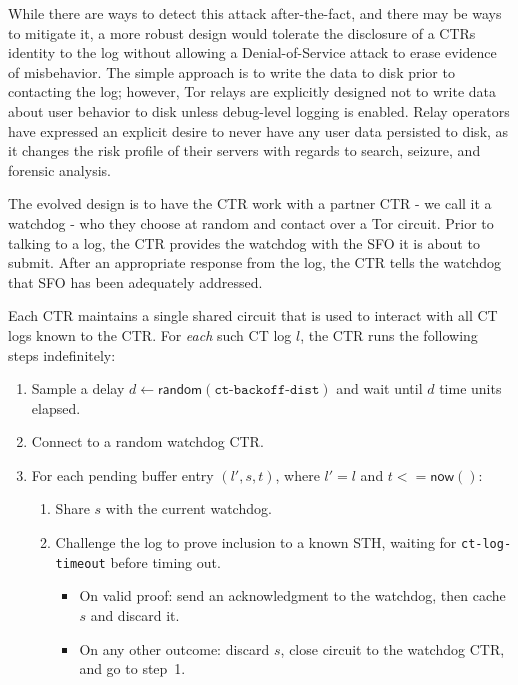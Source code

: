 While there are ways to detect this attack after-the-fact, and there may be ways to mitigate
it, a more robust design would tolerate the disclosure of a CTRs identity to the log
without allowing a Denial-of-Service attack to erase evidence of misbehavior.  The
simple approach is to write the data to disk prior to contacting the log; however, Tor relays
are explicitly designed not to write data about user behavior to disk unless
debug-level logging is enabled. Relay operators have expressed an explicit desire
to never have any user data persisted to disk, as it changes the risk profile of
their servers with regards to search, seizure, and forensic analysis.

The evolved design is to have the CTR work with a partner CTR - we call it
a watchdog - who they choose at random and contact over a Tor circuit. Prior to talking
to a log, the CTR provides the watchdog with the SFO it is about to submit. After
an appropriate response from the log, the CTR tells the watchdog that SFO has been
adequately addressed.

Each CTR maintains a single shared circuit that is used to interact with all CT
logs known to the CTR\@. For \emph{each} such CT log $l$, the
CTR runs the following steps indefinitely:
\begin{enumerate}
    \item\label{enm:auditing:backoff} Sample a delay $d \gets
        \mathsf{random}(\texttt{ct-backoff-dist})$ and wait until $d$ time units
        elapsed.
    \item Connect to a random watchdog CTR\@.
    \item\label{enm:auditing:loop} For each pending buffer entry $(l',s,t)$,
    where $l' = l$ and $t <= \mathsf{now}()$:
		\begin{enumerate}
			\item\label{enm:ext:auditing:watchdog} Share $s$ with the current
				watchdog.
			\item\label{enm:ext:auditing:challenge} Challenge the log to prove
                                  inclusion to a known STH, waiting for \texttt{ct-log-timeout} before
                                  timing out.
				\begin{itemize}
					\item\label{enm:ext:auditing:challenge:success} On valid
						proof: send an acknowledgment to the watchdog, then
						cache $s$ and discard it.
					\item\label{enm:ext:auditing:challenge:fail} On any other
						outcome: discard $s$, close circuit to the watchdog CTR,
						and go to step~1.
				\end{itemize}
		\end{enumerate}
\end{enumerate}

